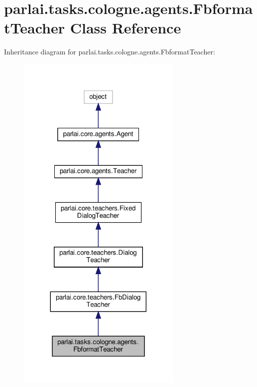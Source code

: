 \hypertarget{classparlai_1_1tasks_1_1cologne_1_1agents_1_1FbformatTeacher}{}\section{parlai.\+tasks.\+cologne.\+agents.\+Fbformat\+Teacher Class Reference}
\label{classparlai_1_1tasks_1_1cologne_1_1agents_1_1FbformatTeacher}


Inheritance diagram for parlai.\+tasks.\+cologne.\+agents.\+Fbformat\+Teacher\+:
\nopagebreak
\begin{figure}[H]
\begin{center}
\leavevmode
\includegraphics[width=224pt]{classparlai_1_1tasks_1_1cologne_1_1agents_1_1FbformatTeacher__inherit__graph}
\end{center}
\end{figure}


